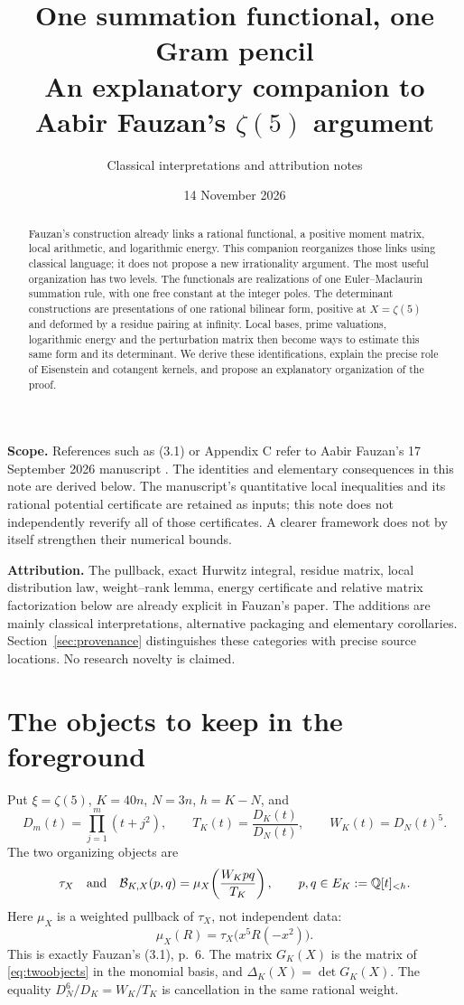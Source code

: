 \documentclass[11pt]{article}
\title{One summation functional, one Gram pencil\\[3pt]
\large An explanatory companion to Aabir Fauzan's $\zeta(5)$ argument}
\author{Classical interpretations and attribution notes}
\date{14 November 2026}
\theoremstyle{definition}
\theoremstyle{remark}\newtheorem*{remark}{Remark}
\newcommand{\Q}{\mathbb Q}
\newcommand{\pair}{\mathcal B}
\begin{document}
\maketitle
\begin{abstract}
Fauzan's construction already links a rational functional, a positive moment
matrix, local arithmetic, and logarithmic energy. This companion reorganizes
those links using classical language; it does not propose a new irrationality
argument. The most useful organization has two levels. The functionals are realizations of
one Euler--Maclaurin summation rule, with one free constant at the integer poles.
The determinant constructions are presentations of one rational bilinear form,
positive at $X=\zeta(5)$ and deformed by a residue pairing at infinity.
Local bases, prime valuations, logarithmic energy and the perturbation matrix
then become ways to estimate this same form and its determinant. We derive
these identifications, explain the precise role of Eisenstein and cotangent
kernels, and propose an explanatory organization of the proof.
\end{abstract}

\textbf{Scope.} References such as (3.1) or Appendix C refer to Aabir Fauzan's
17 September 2026 manuscript \cite{F}. The identities and elementary consequences
in this note are derived below. The manuscript's quantitative local inequalities
and its rational potential certificate are retained as inputs; this note does
not independently reverify all of those certificates. A clearer framework does
not by itself strengthen their numerical bounds.

\textbf{Attribution.} The pullback, exact Hurwitz integral, residue matrix,
local distribution law, weight--rank lemma, energy certificate and relative
matrix factorization below are already explicit in Fauzan's paper. The
additions are mainly classical interpretations, alternative packaging and
elementary corollaries. Section~\ref{sec:provenance} distinguishes these
categories with precise source locations. No research novelty is claimed.

\section{The objects to keep in the foreground}

Put $\xi=\zeta(5)$, $K=40n$, $N=3n$, $h=K-N$, and
\[
 D_m(t)=\prod_{j=1}^m(t+j^2),\qquad
 T_K(t)=\frac{D_K(t)}{D_N(t)},\qquad W_K(t)=D_N(t)^5.
\]
The two organizing objects are
\begin{equation}\label{eq:twoobjects}
 \tau_X\quad\hbox{and}\quad
 \pair_{K,X}(p,q)=\mu_X\!\left(\frac{W_Kpq}{T_K}\right),
 \qquad p,q\in E_K:=\Q[t]_{<h}.
\end{equation}
Here $\mu_X$ is a weighted pullback of $\tau_X$, not independent data:
\begin{equation}\label{eq:pullback}
 \mu_X(R)=\tau_X\bigl(x^5R(-x^2)\bigr).
\end{equation}
This is exactly Fauzan's (3.1), p.~6.
The matrix $G_K(X)$ is the matrix of \eqref{eq:twoobjects} in the monomial basis,
and $\Delta_K(X)=\det G_K(X)$. The equality
$D_N^6/D_K=W_K/T_K$ is cancellation in the same rational weight.
\end{document}
